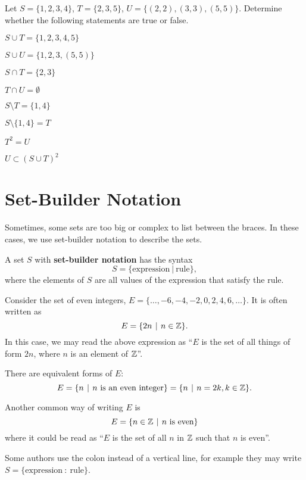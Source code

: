 \begin{exercise}
    Let $S = \{1, 2, 3, 4\}$, $T = \{2, 3, 5\}$, $U = \{(2, 2), (3, 3), (5, 5)\}$. Determine whether the following statements are true or false.
    \begin{multicols}{2}
        \begin{partquestions}{\alph*}
            \item $S \cup T = \{1, 2, 3, 4, 5\}$
            \item $S \cup U = \{1, 2, 3, (5, 5)\}$
            \item $S \cap T = \{2, 3\}$
            \item $T \cap U = \emptyset$
            \item $S \setminus T = \{1, 4\}$
            \item $S \setminus \{1, 4\} = T$
            \item $T^2 = U$
            \item $U \subset (S \cup T)^2$
        \end{partquestions}
    \end{multicols}
\end{exercise}

\newpage

\section{Set-Builder Notation}
Sometimes, some sets are too big or complex to list between the braces. In these cases, we use set-builder notation to describe the sets.
\begin{definition}
    A set $S$ with \textbf{set-builder notation} has the syntax
    \[
        S = \{\mathrm{expression} \ | \ \mathrm{rule}\},
    \]
    where the elements of $S$ are all values of the expression that satisfy the rule.
\end{definition}

\begin{example}
    Consider the set of even integers, $E = \{\dots, -6, -4, -2, 0, 2, 4, 6, \dots\}$. It is often written as
    \[
        E = \{2n \vert n \in \Z\}.
    \]
    In this case, we may read the above expression as ``$E$ is the set of all things of form $2n$, where $n$ is an element of $\mathbb{Z}$''.

    There are equivalent forms of $E$:
    \[
        E = \{n \vert n \textrm{ is an even integer}\} = \{n \vert n = 2k, k \in \Z\}.
    \]

    Another common way of writing $E$ is
    \[
        E = \{n \in \Z \vert n \textrm{ is even}\}
    \]
    where it could be read as ``$E$ is the set of all $n$ in $\mathbb{Z}$ such that $n$ is even''.
\end{example}
\begin{remark}
    Some authors use the colon instead of a vertical line, for example they may write $S = \{\mathrm{expression} \ : \ \mathrm{rule}\}$.
\end{remark}

